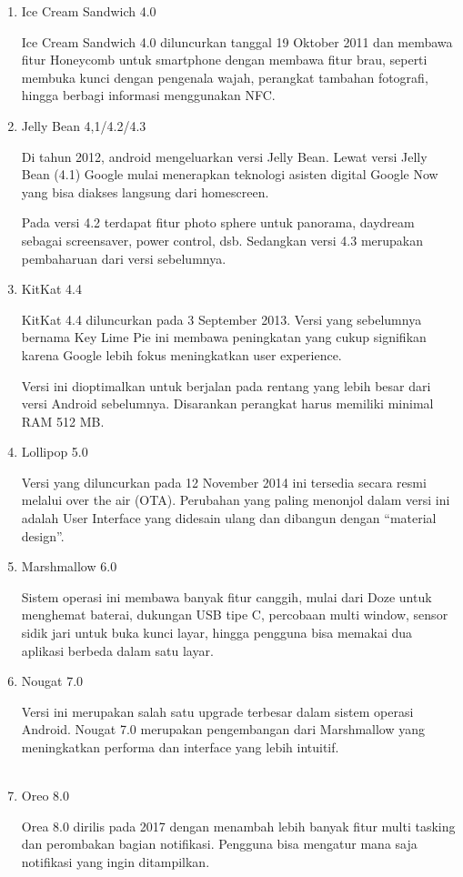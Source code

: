 \begin{enumerate}
\item Ice Cream Sandwich 4.0
\par Ice Cream Sandwich 4.0 diluncurkan tanggal 19 Oktober 2011 dan membawa fitur Honeycomb untuk smartphone dengan membawa fitur brau, seperti membuka kunci dengan pengenala wajah, perangkat tambahan fotografi, hingga berbagi informasi menggunakan NFC.
\item Jelly Bean 4,1/4.2/4.3
\par Di tahun 2012, android mengeluarkan versi Jelly Bean. Lewat versi Jelly Bean (4.1) Google mulai menerapkan teknologi asisten digital Google Now yang bisa diakses langsung dari homescreen.

\par Pada versi 4.2 terdapat fitur photo sphere untuk panorama, daydream sebagai screensaver, power control, dsb. Sedangkan versi 4.3 merupakan pembaharuan dari versi sebelumnya.
\item KitKat 4.4
\par KitKat 4.4 diluncurkan pada 3 September 2013. Versi yang sebelumnya bernama Key Lime Pie ini membawa peningkatan yang cukup signifikan karena Google lebih fokus meningkatkan user experience.

\par Versi ini dioptimalkan untuk berjalan pada rentang yang lebih besar dari versi Android sebelumnya. Disarankan perangkat harus memiliki minimal RAM 512 MB.

\item Lollipop 5.0
\par Versi yang diluncurkan pada 12 November 2014 ini tersedia secara resmi melalui over the air (OTA). Perubahan yang paling menonjol dalam versi ini adalah User Interface yang didesain ulang dan dibangun dengan “material design”.
\item Marshmallow 6.0
\par Sistem operasi ini membawa banyak fitur canggih, mulai dari Doze untuk menghemat baterai, dukungan USB tipe C, percobaan multi window, sensor sidik jari untuk buka kunci layar, hingga pengguna bisa memakai dua aplikasi berbeda dalam satu layar.
\item Nougat 7.0
\par Versi ini merupakan salah satu upgrade terbesar dalam sistem operasi Android. Nougat 7.0 merupakan pengembangan dari Marshmallow yang meningkatkan performa dan interface yang lebih intuitif.\\
\\
\item Oreo 8.0
\par Orea 8.0 dirilis pada 2017 dengan menambah lebih banyak fitur multi tasking dan perombakan bagian notifikasi. Pengguna bisa mengatur mana saja notifikasi yang ingin ditampilkan.


\end{enumerate}
